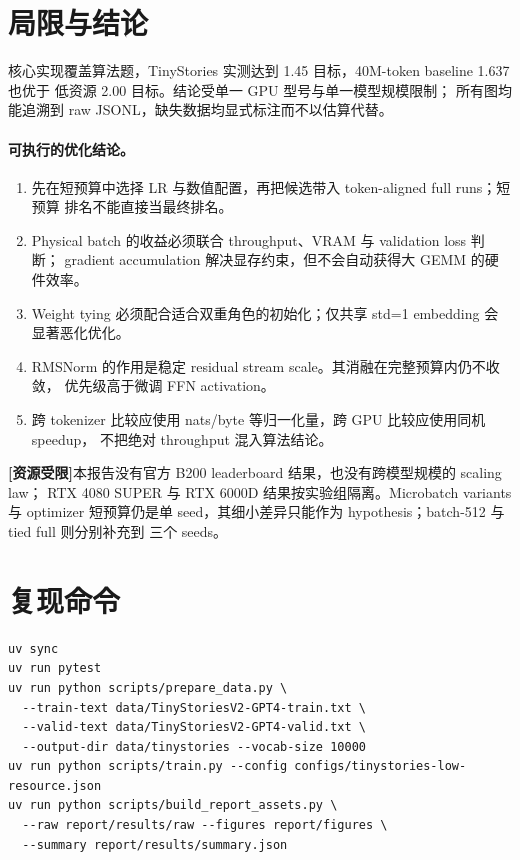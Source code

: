 \documentclass[UTF8,a4paper,11pt]{ctexart}
\newcommand{\limited}{\textbf{[资源受限]}}
\begin{document}
\section{局限与结论}
核心实现覆盖算法题，TinyStories 实测达到 1.45 目标，40M-token baseline 1.637 也优于
低资源 2.00 目标。结论受单一 GPU 型号与单一模型规模限制；
所有图均能追溯到 raw JSONL，缺失数据均显式标注而不以估算代替。

\paragraph{可执行的优化结论。}
\begin{enumerate}
  \item 先在短预算中选择 LR 与数值配置，再把候选带入 token-aligned full runs；短预算
  排名不能直接当最终排名。
  \item Physical batch 的收益必须联合 throughput、VRAM 与 validation loss 判断；
  gradient accumulation 解决显存约束，但不会自动获得大 GEMM 的硬件效率。
  \item Weight tying 必须配合适合双重角色的初始化；仅共享 std=1 embedding 会显著恶化优化。
  \item RMSNorm 的作用是稳定 residual stream scale。其消融在完整预算内仍不收敛，
  优先级高于微调 FFN activation。
  \item 跨 tokenizer 比较应使用 nats/byte 等归一化量，跨 GPU 比较应使用同机 speedup，
  不把绝对 throughput 混入算法结论。
\end{enumerate}

\limited 本报告没有官方 B200 leaderboard 结果，也没有跨模型规模的 scaling law；
RTX 4080 SUPER 与 RTX 6000D 结果按实验组隔离。Microbatch variants 与 optimizer
短预算仍是单 seed，其细小差异只能作为 hypothesis；batch-512 与 tied full 则分别补充到
三个 seeds。

\appendix
\section{复现命令}
\begin{lstlisting}
uv sync
uv run pytest
uv run python scripts/prepare_data.py \
  --train-text data/TinyStoriesV2-GPT4-train.txt \
  --valid-text data/TinyStoriesV2-GPT4-valid.txt \
  --output-dir data/tinystories --vocab-size 10000
uv run python scripts/train.py --config configs/tinystories-low-resource.json
uv run python scripts/build_report_assets.py \
  --raw report/results/raw --figures report/figures \
  --summary report/results/summary.json
\end{lstlisting}
\end{document}
